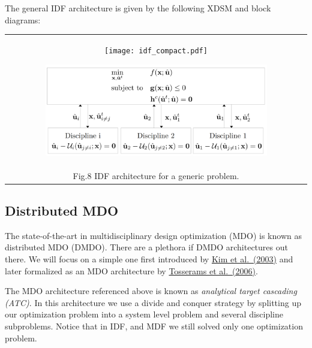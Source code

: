 \documentclass[11pt]{article}
\begin{document}
The general IDF architecture is given by the following XDSM and block
diagrams:

\begin{longtable}[]{@{}c@{}}
    \toprule
    \endhead
    \begin{minipage}[t]{0.97\columnwidth}\centering
        \begin{figure}
            \centering
            \texttt{[image: idf\_compact.pdf]}
        \end{figure}
        \begin{figure}
            \centering
            \includegraphics[width=0.9\textwidth]{images/IDF_diagram.png}
        \end{figure}
    \end{minipage}\tabularnewline
    Fig.8 IDF architecture for a generic problem.\tabularnewline
    \bottomrule
\end{longtable}

    \hypertarget{distributed-mdo}{%
\subsection{Distributed MDO}\label{distributed-mdo}}

The state-of-the-art in multidisciplinary design optimization (MDO) is
known as distributed MDO (DMDO). There are a plethora if DMDO
architectures out there. We will focus on a simple one first introduced
by
\href{https://asmedigitalcollection.asme.org/mechanicaldesign/article-abstract/125/3/481/476066/Analytical-Target-Cascading-in-Automotive-Vehicle?redirectedFrom=fulltext}{Kim
et al.~(2003)} and later formalized as an MDO architecture by
\href{https://link.springer.com/article/10.1007/s00158-005-0579-0}{Tosserams
et al.~(2006)}.

The MDO architecture referenced above is known as \emph{analytical
target cascading (ATC)}. In this architecture we use a divide and
conquer strategy by splitting up our optimization problem into a system
level problem and several discipline subproblems. Notice that in IDF,
and MDF we still solved only one optimization problem.
\end{document}
